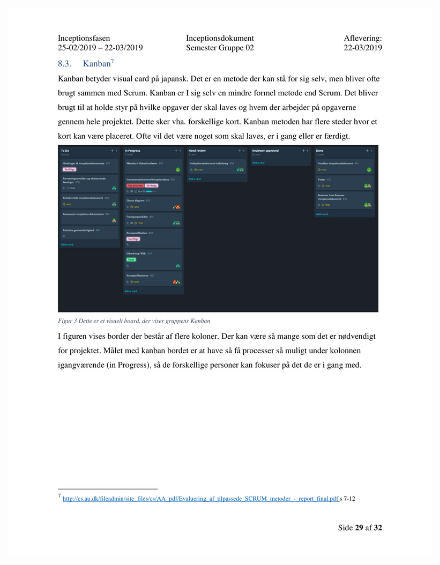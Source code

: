 \begin{figure}[hb]
  \includegraphics[scale = 0.33]{./PNG/Inceptions/Gruppe 02 + InceptionsDokument-30.jpg} 
\end{figure}


